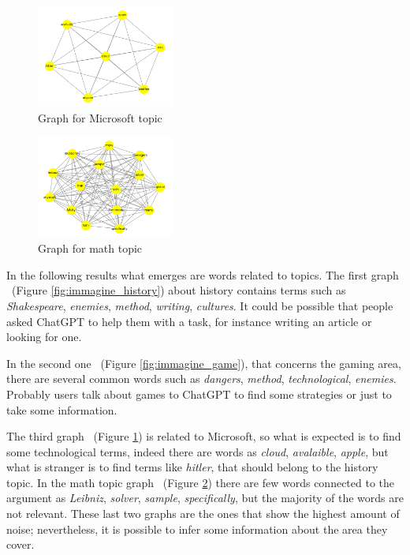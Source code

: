 \documentclass[sigchi]{acmart}
\begin{document}
\begin{figure}[H]
  \centering
  \includegraphics[width=0.4\textwidth]{terzo.png}
  \caption{Graph for Microsoft topic}
  \label{fig:immagine_mi}
\end{figure}

\begin{figure}[H]
  \centering
  \includegraphics[width=0.4\textwidth]{quarto.png}
  \caption{Graph for math topic}
  \label{fig:immagine_math}
\end{figure}

In the following results what emerges are words related to topics. The first graph ~(Figure \ref{fig:immagine_history}) about history contains terms such as \textit{Shakespeare}, \textit{enemies}, \textit{method}, \textit{writing}, \textit{cultures}. It could be possible that people asked ChatGPT to help them with a task, for instance writing an article or looking for one.

In the second one ~(Figure \ref{fig:immagine_game}), that concerns the gaming area, there are several common words such as \textit{dangers}, \textit{method}, \textit{technological}, \textit{enemies}. Probably users talk about games to ChatGPT to find some strategies or just to take some information. 

The third graph ~(Figure \ref{fig:immagine_mi}) is related to Microsoft, so what is expected is to find some technological terms, indeed there are words as \textit{cloud}, \textit{avalaible}, \textit{apple}, but what is stranger is to find terms like \textit{hitler}, that should belong to the history topic. In the math topic graph ~(Figure \ref{fig:immagine_math}) there are few words connected to the argument as \textit{Leibniz}, \textit{solver}, \textit{sample}, \textit{specifically}, but the majority of the words are not relevant.
These last two graphs are the ones that show the highest amount of noise; nevertheless, it is possible to infer some information about the area they cover.
\end{document}
